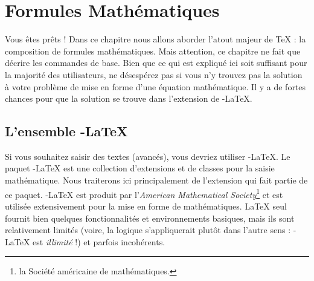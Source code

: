 %
%
%
%



\chapter{Formules Mathématiques}
\thispagestyle{plain}

\begin{intro}
  Vous êtes prêts ! Dans ce chapitre nous allons aborder l'atout
  majeur de \TeX{} : la composition de formules mathématiques.
  Mais attention, ce chapitre ne fait que décrire les commandes de
  base. Bien que ce qui est expliqué ici soit suffisant pour la
  majorité des utilisateurs, ne désespérez pas si vous n'y trouvez pas
  la solution à votre problème de mise en forme d'une équation
  mathématique. Il y a de fortes chances pour que la solution se
  trouve dans l'extension  de \AmS-\LaTeX{}.%
\end{intro}
  
\section{L'ensemble \texorpdfstring{\AmS}{AMS}-\LaTeX{}}

Si vous souhaitez saisir des textes  (avancés), vous
devriez utiliser \AmS-\LaTeX{}. Le paquet \AmS-\LaTeX{} est une
collection d'extensions et de classes pour la saisie
mathématique. Nous traiterons ici principalement de l'extension
 qui fait partie de ce paquet. \AmS-\LaTeX{} est produit
par l'\emph{American Mathematical Society}\footnote{la Société
  américaine de mathématiques. \NdT} et est utilisée extensivement pour la
mise en forme de mathématiques. \LaTeX{} seul fournit bien quelques
fonctionnalités et environnements basiques, mais ils sont
relativement limités (voire, la logique s'appliquerait plutôt dans
l'autre sens : \AmS-\LaTeX{} est \emph{illimité} !) et parfois
incohérents.

